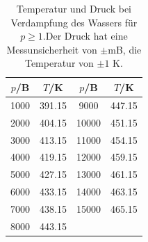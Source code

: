\begin{table}[H]
  \centering
  \caption{Temperatur und Druck bei Verdampfung des Wassers für $p\geq 1$.Der Druck hat eine Messunsicherheit von
  $\pm$mB, die Temperatur von $\pm 1$ K.}
  \label{tab:Messreihe_2}
\begin{tabular}{
  c c||c c
}
\toprule 
$p$/B & $T$/K & $p$/B & $T$/K\\
\midrule
1000  & 391.15 & 9000  & 447.15\\
2000  & 404.15 & 10000 & 451.15\\
3000  & 413.15 & 11000 & 454.15\\
4000  & 419.15 & 12000 & 459.15\\
5000  & 427.15 & 13000 & 461.15\\
6000  & 433.15 & 14000 & 463.15\\
7000  & 438.15 & 15000 & 465.15\\
8000  & 443.15 &       &      \\
\bottomrule
\end{tabular}
\end{table}
